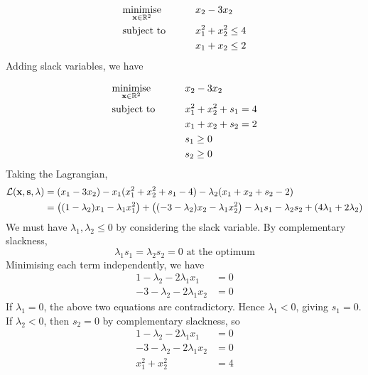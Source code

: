 \begin{example}
    \begin{alignat*}{2}
        &\underset{\vb x \in \mathbb R^2}{\text{minimise}}        &\qquad& x_2 - 3x_2\\
        &\text{subject to} &      & x_1^2 + x_2^2 \leq 4 \\
        &&& x_1 + x_2 \leq 2
        \end{alignat*}
        Adding slack variables, we have

        \begin{alignat*}{2}
            &\underset{\vb x \in \mathbb R^2}{\text{minimise}}        &\qquad& x_2 - 3x_2\\
            &\text{subject to} &      & x_1^2 + x_2^2 + s_1 = 4 \\
            &&& x_1 + x_2 + s_2 = 2\\
            &&& s_1 \geq 0\\
            &&& s_2 \geq 0
            \end{alignat*}
            Taking the Lagrangian,
            \begin{align*}
                \mathcal L(\vb x, \vb s, \vb \lambda) &= (x_1 - 3x_2) - x_1(x_1^2 + x_2^2 + s_1 - 4) - \lambda_2(x_1 + x_2 + s_2 - 2) \\
                &= \qty((1 - \lambda_2)x_1 - \lambda_1 x_1^2) + \qty((-3-\lambda_2)x_2 - \lambda_1 x_2^2) - \lambda_1 s_1 - \lambda_2 s_2 + (4\lambda_1 + 2\lambda_2)
            \end{align*}
            We must have \(\lambda_1, \lambda_2 \leq 0\) by considering the slack variable. By complementary slackness,
            \[ \lambda_1 s_1 = \lambda_2 s_2 = 0 \text{ at the optimum} \]
            Minimising each term independently, we have
            \begin{align*}
                1 - \lambda_2 - 2\lambda_1 x_1 &= 0 \\
                -3-\lambda_2 - 2\lambda_1 x_2 &= 0
            \end{align*}
            If \(\lambda_1 = 0\), the above two equations are contradictory.
            Hence \(\lambda_1 < 0\), giving \(s_1 = 0\).
            If \(\lambda_2 < 0\), then \(s_2 = 0\) by complementary slackness, so
            \begin{align*}
                1 - \lambda_2 - 2\lambda_1 x_1 &= 0 \\
                -3-\lambda_2 - 2\lambda_1 x_2 &= 0 \\
                x_1^2 + x_2^2 &= 4 \\

\end{align*}
\end{example}

